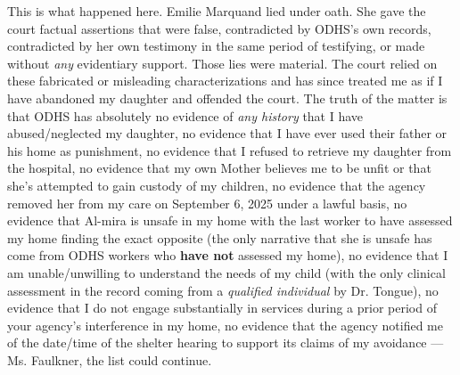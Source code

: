 \documentclass[10pt,a4paper,roman]{moderncv}
\begin{document}
	\noindent This is what happened here. Emilie Marquand lied under oath. She gave the court factual assertions that were false, contradicted by ODHS's own records, contradicted by her own testimony in the same period of testifying, or made without \textit{any} evidentiary support. Those lies were material. The court relied on these fabricated or misleading characterizations and has since treated me as if I have abandoned my daughter and offended the court. The truth of the matter is that ODHS has absolutely no evidence of \textit{any history} that I have abused/neglected my daughter, no evidence that I have ever used their father or his home as punishment, no evidence that I refused to retrieve my daughter from the hospital, no evidence that my own Mother believes me to be unfit or that she's attempted to gain custody of my children, no evidence that the agency removed her from my care on September 6, 2025 under a lawful basis, no evidence that Al-mira is unsafe in my home with the last worker to have assessed my home finding the exact opposite (the only narrative that she is unsafe has come from ODHS workers who \textbf{have not} assessed my home), no evidence that I am unable/unwilling to understand the needs of my child (with the only clinical assessment in the record coming from a \textit{qualified individual} by Dr. Tongue), no evidence that I do not engage substantially in services during a prior period of your agency's interference in my home, no evidence that the agency notified me of the date/time of the shelter hearing to support its claims of my avoidance --- Ms. Faulkner, the list could continue. \\
	
\end{document}
